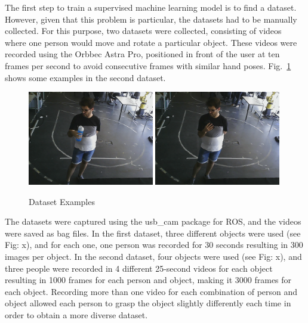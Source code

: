 The first step to train a supervised machine learning model is to find a dataset. However, given that this problem is particular, the datasets had to be manually collected. For this purpose, two datasets were collected, consisting of videos where one person would move and rotate a particular object. These videos were recorded using the Orbbec Astra Pro, positioned in front of the user at ten frames per second to avoid consecutive frames with similar hand poses. Fig.~\ref{fig:dataset_examples} shows some examples in the second dataset.

\begin{figure}[H]
    \centerline{\includegraphics[width=0.49\textwidth]{figs/dataset_preprocessing1_1.png} \includegraphics[width=0.49\textwidth]{figs/dataset_preprocessing1_2.png}}
    \caption[Dataset Examples]{Dataset Examples}
    \label{fig:dataset_examples}
\end{figure}

The datasets were captured using the usb\_cam package for ROS, and the videos were saved as bag files. In the first dataset, three different objects were used (see Fig: x), and for each one, one person was recorded for 30 seconds resulting in 300 images per object. In the second dataset, four objects were used (see Fig: x), and three people were recorded in 4 different 25-second videos for each object resulting in 1000 frames for each person and object, making it 3000 frames for each object. Recording more than one video for each combination of person and object allowed each person to grasp the object slightly differently each time in order to obtain a more diverse dataset.


